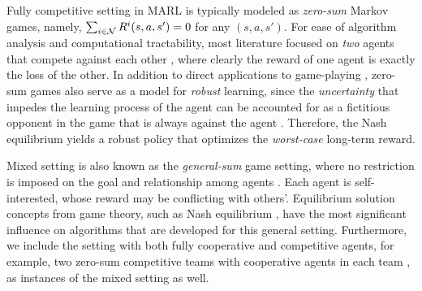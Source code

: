 \vspace{7pt}
\vspace{5pt}

Fully competitive setting in MARL is typically modeled as \emph{zero-sum} Markov games, namely, $\sum_{i\in\mathcal{N}}R^i(s,a,s')=0$ for any $(s,a,s')$. For ease of algorithm analysis and computational tractability, most literature focused on  
\emph{two} agents  that compete  against each other \cite{littman1994markov}, where clearly the reward of one agent is exactly the loss of the other. 
In addition to  direct applications to game-playing \cite{littman1994markov,silver2017mastering,OpenAI_dota_1v1}, zero-sum games also serve as a model for \emph{robust} learning, since the \emph{uncertainty} that impedes the learning process of the agent can be accounted for as 
a fictitious opponent in the game that is always against the agent   \cite{jacobson1973optimal,bacsar1995h,zhang2019policy}. Therefore, the Nash equilibrium yields a robust policy that optimizes the \emph{worst-case} long-term reward. 



\vspace{7pt}
\vspace{5pt}


Mixed setting is also known as the \emph{general-sum} game setting, where no  restriction  is imposed on the goal and relationship among agents \cite{hu2003nash,littman2001friend}. Each agent is self-interested, whose reward may be conflicting  with others'. Equilibrium solution  concepts from game theory, such as Nash equilibrium \cite{basar1999dynamic}, have  the most significant influence on algorithms that are developed for  this general setting.  Furthermore, we include the setting with both fully cooperative and competitive agents, for example, two zero-sum competitive teams with cooperative agents in each team \cite{lagoudakis2003learning,zhang2018finite,OpenAI_dota}, as instances of the mixed setting as well.




